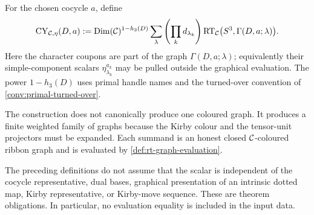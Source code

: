 \begin{definition}
\label{def:role-aware-handle-evaluator}
For the chosen cocycle $a$, define
\[
  \operatorname{CY}_{\mathcal{C},\eta}(D,a)
  :=
  \operatorname{Dim}(\mathcal{C})^{1-h_3(D)}
  \sum_{\lambda}
    \left(\prod_k d_{\lambda_k}\right)
    \operatorname{RT}_{\mathcal{C}}
      \bigl(S^3,\Gamma(D,a;\lambda)\bigr).
\]
Here the character coupons are part of the graph
$\Gamma(D,a;\lambda)$; equivalently their simple-component scalars
$\eta_{\lambda_k}^{a_k}$ may be pulled outside the graphical evaluation.
The power $1-h_3(D)$ uses primal handle names and the turned-over convention
of \cref{conv:primal-turned-over}.
\end{definition}

\begin{remark}
\label{rem:evaluator-finite-sum}
The construction does not canonically produce one coloured graph.  It
produces a finite weighted family of graphs because the Kirby colour and the
tensor-unit projectors must be expanded.  Each summand is an honest closed
$\mathcal{C}$-coloured ribbon graph and is evaluated by
\cref{def:rt-graph-evaluation}.
\end{remark}

\begin{remark}
\label{rem:evaluator-proof-obligations}
The preceding definitions do not assume that the scalar is independent of
the cocycle representative, dual bases, graphical presentation of an
intrinsic dotted map, Kirby representative, or Kirby-move sequence.  These
are theorem obligations.  In particular, no evaluation equality is included
in the input data.
\end{remark}
